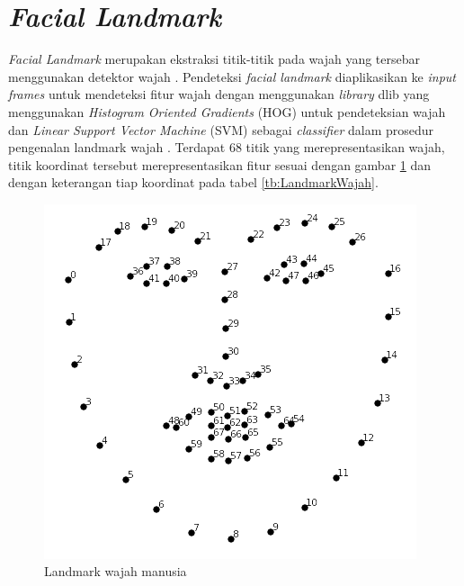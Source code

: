 \section{\emph{Facial Landmark}}
\emph{Facial Landmark} merupakan ekstraksi titik-titik pada wajah yang tersebar menggunakan detektor wajah \parencite{15}.  Pendeteksi
\emph{facial landmark} diaplikasikan ke \emph{input frames} untuk mendeteksi fitur wajah dengan menggunakan \emph{library} dlib yang
menggunakan \emph{Histogram Oriented Gradients} (HOG) untuk pendeteksian wajah dan \emph{Linear Support Vector Machine} (SVM)
sebagai \emph{classifier} dalam prosedur pengenalan landmark wajah \parencite{16}. Terdapat 68 titik yang merepresentasikan wajah,
titik koordinat tersebut merepresentasikan fitur sesuai dengan gambar \ref{fig:wajah} dan dengan keterangan tiap koordinat pada
tabel \ref{tb:LandmarkWajah}.

\begin{figure} [ht] \centering
  \includegraphics[scale=0.5]{gambar/wajah.png}
  \caption{Landmark wajah manusia \parencite{16}}
  \label{fig:wajah}
\end{figure}

